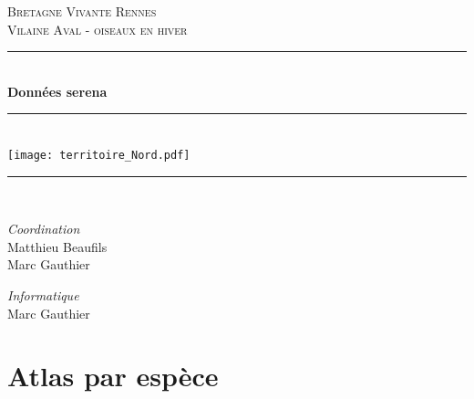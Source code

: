 \documentclass[a4paper,twoside,english]{article}
\newcommand{\HRule}{\rule{\linewidth}{0.5mm}}
\begin{document}
%
\begin{titlepage}
  \begin{sffamily}
  \begin{center}



    \textsc{\LARGE Bretagne Vivante Rennes}\\[1cm]
    \textsc{\Large Vilaine Aval - oiseaux en hiver}\\[1cm]

    \HRule \\[0.4cm]
    { \huge \bfseries Données serena}
    \HRule \\[0.4cm]
    \texttt{[image: territoire\_Nord.pdf]}~\\[.5cm]
    \HRule \\[0.4cm]
    \begin{minipage}{0.4\textwidth}
      \begin{flushleft} \large
        \emph{Coordination}\\
        Matthieu Beaufils\\
         Marc Gauthier
      \end{flushleft}
    \end{minipage}
    \begin{minipage}{0.4\textwidth}
      \begin{flushright} \large
        \emph{Informatique}\\
        Marc Gauthier
      \end{flushright}
    \end{minipage}

    \vfill
  \end{center}
  \end{sffamily}
\end{titlepage}
\setlength{\parskip}{0pt} %
\setlength{\parindent}{0pt}
\twocolumn


\section{Atlas par espèce}
\clearpage


\onecolumn
\end{document}
